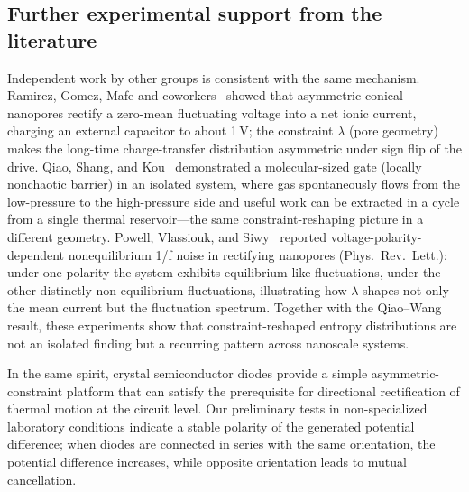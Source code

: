 \documentclass[11pt,a4paper]{article}
\begin{document}
\subsection{Further experimental support from the literature}

Independent work by other groups is consistent with the same mechanism.
Ramirez, Gomez, Mafe and coworkers~\cite{ramirez2015energyconversionfluctuating,gomez2015chargingcapacitor} showed that asymmetric conical nanopores rectify a zero-mean fluctuating voltage into a net ionic current, charging an external capacitor to about 1\,V; the constraint $\lambda$ (pore geometry) makes the long-time charge-transfer distribution asymmetric under sign flip of the drive. Qiao, Shang, and Kou~\cite{qiao2021moleculargate} demonstrated a molecular-sized gate (locally nonchaotic barrier) in an isolated system, where gas spontaneously flows from the low-pressure to the high-pressure side and useful work can be extracted in a cycle from a single thermal reservoir---the same constraint-reshaping picture in a different geometry. Powell, Vlassiouk, and Siwy~\cite{powell2009nonequilibrium1f} reported voltage-polarity-dependent nonequilibrium 1/f noise in rectifying nanopores (Phys.\ Rev.\ Lett.): under one polarity the system exhibits equilibrium-like fluctuations, under the other distinctly non-equilibrium fluctuations, illustrating how $\lambda$ shapes not only the mean current but the fluctuation spectrum. Together with the Qiao--Wang result, these experiments show that constraint-reshaped entropy distributions are not an isolated finding but a recurring pattern across nanoscale systems.

In the same spirit, crystal semiconductor diodes provide a simple asymmetric-constraint
platform that can satisfy the prerequisite for directional rectification of thermal
motion at the circuit level. Our preliminary tests in non-specialized laboratory
conditions indicate a stable polarity of the generated potential difference;
when diodes are connected in series with the same orientation, the potential
difference increases, while opposite orientation leads to mutual cancellation.
\end{document}
